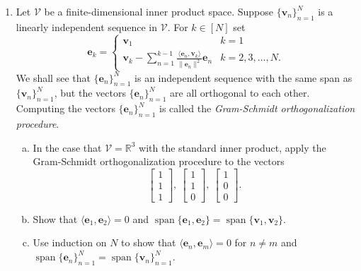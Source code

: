 \documentclass[12pt]{amsart}
\newcommand{\1}{\mathbbm{1}}
\numberwithin{equation}{section}
\numberwithin{Theorem}{section}
\theoremstyle{plain} %
\theoremstyle{definition}
\theoremstyle{remark}
\begin{document}
\thispagestyle{empty}

\bigskip


\begin{enumerate}[1.]

\item Let \(\mathcal{V}\) be a finite-dimensional inner product space. Suppose \(\{\mathbf{v}_{n}\}_{n=1}^{N}\) is a linearly independent sequence in \(\mathcal{V}\).
For \(k\in[N]\) set
\[\mathbf{e}_{k} = \begin{cases} \mathbf{v}_{1} & k=1\\ \displaystyle{\mathbf{v}_{k} - \sum_{n=1}^{k-1}\frac{\langle \mathbf{e}_{n},\mathbf{v}_{k}\rangle}{\|\mathbf{e}_{n}\|^{2}} \mathbf{e}_{n}} & k=2,3,\ldots,N.\end{cases}\]
We shall see that \(\{\mathbf{e}_{n}\}_{n=1}^{N}\) is an independent sequence with the same span as \(\{\mathbf{v}_{n}\}_{n=1}^{N}\), but the vectors \(\{\mathbf{e}_{n}\}_{n=1}^{N}\) are all orthogonal to each other. Computing the vectors \(\{\mathbf{e}_{n}\}_{n=1}^{N}\) is called the \textit{Gram-Schmidt orthogonalization procedure}.\bigskip

\begin{enumerate}[(a)]

\item In the case that \(\mathcal{V} = \mathbb{R}^{3}\) with the standard inner product, apply the Gram-Schmidt orthogonalization procedure to the vectors 
\[\begin{bmatrix} 1\\1\\1\end{bmatrix},\ \begin{bmatrix} 1\\1\\0\end{bmatrix},\ \begin{bmatrix} 1\\0\\0\end{bmatrix}.\]
\bigskip

\item Show that \(\langle \mathbf{e}_{1},\mathbf{e}_{2}\rangle = 0\) and \(\operatorname{span}\{\mathbf{e}_{1},\mathbf{e}_{2}\} = \operatorname{span}\{\mathbf{v}_{1},\mathbf{v}_{2}\}\).\bigskip

\item Use induction on \(N\) to show that \(\langle \mathbf{e}_{n},\mathbf{e}_{m}\rangle = 0\) for \(n\neq m\) and \(\operatorname{span} \{\mathbf{e}_{n}\}_{n=1}^{N} = \operatorname{span}\{\mathbf{v}_{n}\}_{n=1}^{N}\).\bigskip


\end{enumerate}
\end{enumerate}
\end{document}
